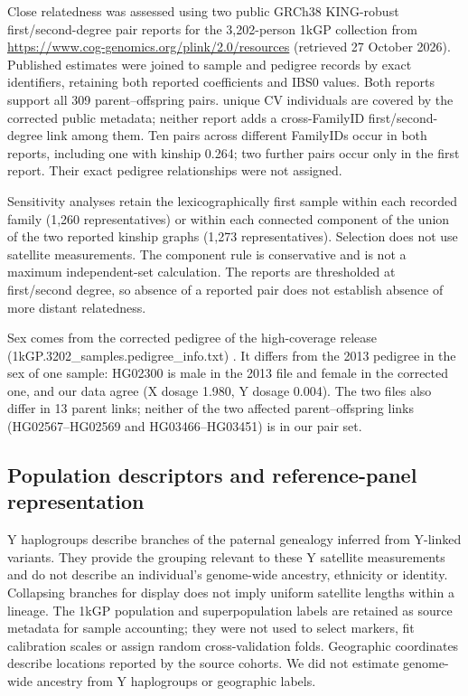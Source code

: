 Close relatedness was assessed using two public GRCh38 KING-robust first/second-degree pair reports for the 3,202-person 1kGP collection from \url{https://www.cog-genomics.org/plink/2.0/resources} (retrieved 27 October 2026). Published estimates were joined to sample and pedigree records by exact identifiers, retaining both reported coefficients and IBS0 values. Both reports support all 309 parent--offspring pairs.  unique CV individuals are covered by the corrected public metadata; neither report adds a cross-FamilyID first/second-degree link among them. Ten pairs across different FamilyIDs occur in both reports, including one with kinship 0.264; two further pairs occur only in the first report. Their exact pedigree relationships were not assigned.

Sensitivity analyses retain the lexicographically first sample within each recorded family (1,260 representatives) or within each connected component of the union of the two reported kinship graphs (1,273 representatives). Selection does not use satellite measurements. The component rule is conservative and is not a maximum independent-set calculation. The reports are thresholded at first/second degree, so absence of a reported pair does not establish absence of more distant relatedness.

Sex comes from the corrected pedigree of the high-coverage release (1kGP.3202\_samples.pedigree\_info.txt) \cite{ByrskaBishop2022}. It differs from the 2013 pedigree in the sex of one sample: HG02300 is male in the 2013 file and female in the corrected one, and our data agree (X dosage 1.980, Y dosage 0.004). The two files also differ in 13 parent links; neither of the two affected parent--offspring links (HG02567--HG02569 and HG03466--HG03451) is in our pair set.

\subsection{Population descriptors and reference-panel representation}\label{sec:m-descriptors}
Y haplogroups describe branches of the paternal genealogy inferred from Y-linked variants. They provide the grouping relevant to these Y satellite measurements and do not describe an individual's genome-wide ancestry, ethnicity or identity. Collapsing branches for display does not imply uniform satellite lengths within a lineage. The 1kGP population and superpopulation labels are retained as source metadata for sample accounting; they were not used to select markers, fit calibration scales or assign random cross-validation folds. Geographic coordinates describe locations reported by the source cohorts. We did not estimate genome-wide ancestry from Y haplogroups or geographic labels.

